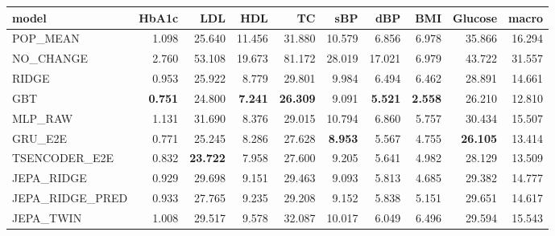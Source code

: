 \begin{tabular}{lrrrrrrrrr}
\toprule
model & HbA1c & LDL & HDL & TC & sBP & dBP & BMI & Glucose & macro \\
\midrule
POP\_MEAN & 1.098 & 25.640 & 11.456 & 31.880 & 10.579 & 6.856 & 6.978 & 35.866 & 16.294 \\
NO\_CHANGE & 2.760 & 53.108 & 19.673 & 81.172 & 28.019 & 17.021 & 6.979 & 43.722 & 31.557 \\
RIDGE & 0.953 & 25.922 & 8.779 & 29.801 & 9.984 & 6.494 & 6.462 & 28.891 & 14.661 \\
GBT & \textbf{0.751} & 24.800 & \textbf{7.241} & \textbf{26.309} & 9.091 & \textbf{5.521} & \textbf{2.558} & 26.210 & 12.810 \\
MLP\_RAW & 1.131 & 31.690 & 8.376 & 29.015 & 10.794 & 6.860 & 5.757 & 30.434 & 15.507 \\
GRU\_E2E & 0.771 & 25.245 & 8.286 & 27.628 & \textbf{8.953} & 5.567 & 4.755 & \textbf{26.105} & 13.414 \\
TSENCODER\_E2E & 0.832 & \textbf{23.722} & 7.958 & 27.600 & 9.205 & 5.641 & 4.982 & 28.129 & 13.509 \\
JEPA\_RIDGE & 0.929 & 29.698 & 9.151 & 29.463 & 9.093 & 5.813 & 4.685 & 29.382 & 14.777 \\
JEPA\_RIDGE\_PRED & 0.933 & 27.765 & 9.235 & 29.208 & 9.152 & 5.838 & 5.151 & 29.651 & 14.617 \\
JEPA\_TWIN & 1.008 & 29.517 & 9.578 & 32.087 & 10.017 & 6.049 & 6.496 & 29.594 & 15.543 \\
\bottomrule
\end{tabular}
